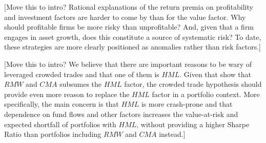 [Move this to intro? Rational explanations of the return premia on profitability and investment factors are harder to come by than for the value factor. Why should profitable firms be more risky than unprofitable? And, given that a firm engages in asset growth, does this constitute a source of systematic risk? To date, these strategies are more clearly positioned as anomalies rather than risk factors.]

[Move this to intro? We believe that there are important reasons to be wary of leveraged crowded trades and that one of them is $HML$. Given that \textcite{FF2015} show that $RMW$ and $CMA$ subsumes the $HML$ factor, the crowded trade hypothesis should provide even more reason to replace the $HML$ factor in a portfolio context. More specifically, the main concern is that $HML$ is more crash-prone and that dependence on fund flows and other factors increases the value-at-risk and expected shortfall of portfolios with $HML$, without providing a higher Sharpe Ratio than portfolios including $RMW$ and $CMA$ instead.]